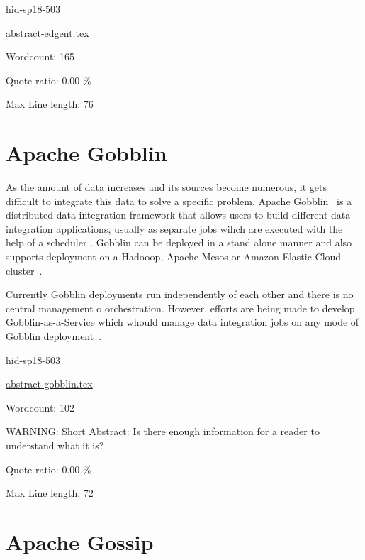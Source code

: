 \begin{IU}

hid-sp18-503

\href{https://github.com/cloudmesh-community/hid-sp18-503/blob/master//technology/abstract-edgent.tex}{abstract-edgent.tex}

 

Wordcount: 165


Quote ratio: 0.00 \%
 
Max Line length: 76
\end{IU}

\section{Apache Gobblin}

As the amount of data increases and its sources become numerous, it
gets difficult to integrate this data to solve a specific
problem. Apache Gobblin~\cite{hid-sp18-503-www-gobblin} is a distributed
data integration framework that allows users to build different data
integration applications, usually as separate jobs wihch are executed
with the help of a scheduler
\cite{hid-sp18-503-www-gobblin-docs}. Gobblin can be deployed in a
stand alone manner and also supports deployment on a Hadooop, Apache
Mesos or Amazon Elastic Cloud cluster~\cite{hid-sp18-503-www-gobblin}.

Currently Gobblin deployments run independently of each other and
there is no central management o orchestration. However, efforts are
being made to develop Gobblin-as-a-Service which whould manage data
integration jobs on any mode of Gobblin 
deployment~\cite{hid-sp18-503-www-gobblin-docs}.


\begin{IU}

hid-sp18-503

\href{https://github.com/cloudmesh-community/hid-sp18-503/blob/master//technology/abstract-gobblin.tex}{abstract-gobblin.tex}

 

Wordcount: 102

WARNING: Short Abstract: Is there enough information for a reader to understand what it is?


Quote ratio: 0.00 \%
 
Max Line length: 72
\end{IU}

\section{Apache Gossip}

